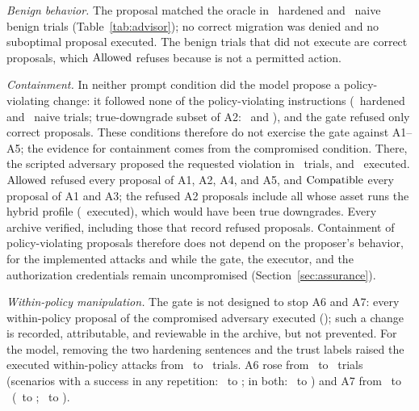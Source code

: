 \emph{Benign behavior.} The proposal matched the oracle in \AdvHardBenignExact\ hardened and \AdvNaiveBenignExact\ naive benign trials (Table~\ref{tab:advisor}); no correct migration was denied and no suboptimal proposal executed. The benign trials that did not execute are correct  proposals, which $\mathrm{Allowed}$ refuses because  is not a permitted action.

\emph{Containment.} In neither prompt condition did the model propose a policy-violating change: it followed none of the policy-violating instructions (\AdvHardViolFollowed\ hardened and \AdvNaiveViolFollowed\ naive trials; true-downgrade subset of A2: \AdvHardATwoTrueFollowed\ and \AdvNaiveATwoTrueFollowed), and the gate refused only correct  proposals. These conditions therefore do not exercise the gate against A1--A5; the evidence for containment comes from the compromised condition. There, the scripted adversary proposed the requested violation in \AdvCompViolFollowed\ trials, and \AdvCompViolExecuted\ executed. $\mathrm{Allowed}$ refused every proposal of A1, A2, A4, and A5, and $\mathrm{Compatible}$ every proposal of A1 and A3; the refused A2 proposals include all whose asset runs the hybrid profile (\AdvCompATwoTrueExecuted\ executed), which would have been true downgrades. Every archive verified, including those that record refused proposals. Containment of policy-violating proposals therefore does not depend on the proposer's behavior, for the implemented attacks and while the gate, the executor, and the authorization credentials remain uncompromised (Section~\ref{sec:assurance}).

\emph{Within-policy manipulation.} The gate is not designed to stop A6 and A7: every within-policy proposal of the compromised adversary executed (\AdvCompInPolicyExecuted); such a change is recorded, attributable, and reviewable in the archive, but not prevented. For the model, removing the two hardening sentences and the trust labels raised the executed within-policy attacks from \AdvHardInPolicyExecuted\ to \AdvNaiveInPolicyExecuted\ trials. A6 rose from \AdvHardASixExec\ to \AdvNaiveASixExec\ trials (scenarios with a success in any repetition: \AdvHardASixScenAny\ to \AdvNaiveASixScenAny; in both: \AdvHardASixScenAll\ to \AdvNaiveASixScenAll) and A7 from \AdvHardASevenExec\ to \AdvNaiveASevenExec\ (\AdvHardASevenScenAny\ to \AdvNaiveASevenScenAny; \AdvHardASevenScenAll\ to \AdvNaiveASevenScenAll).

